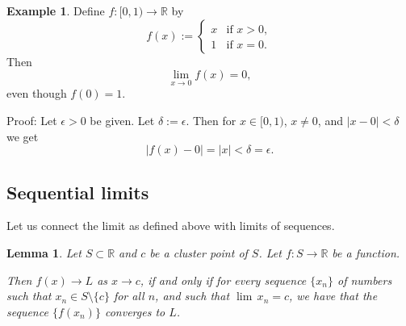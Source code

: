 \documentclass[12pt]{book}
\newcommand{\abs}[1]{\left\lvert {#1} \right\rvert}
\newcommand{\R}{{\mathbb{R}}}
\theoremstyle{plain}
\newtheorem{lemma}[thm]{Lemma}
\theoremstyle{remark}
\theoremstyle{definition}
\theoremstyle{exercise}
\theoremstyle{example}
\newtheorem{example}[thm]{Example}
\begin{document}
\begin{example}
Define $f \colon [0,1) \to \R$ by
\begin{equation*}
f(x) := 
\begin{cases}
x & \text{if $x > 0$} , \\
1 & \text{if $x = 0$} .
\end{cases}
\end{equation*}
Then
\begin{equation*}
\lim_{x\to 0} f(x) = 0 ,
\end{equation*}
even though $f(0) = 1$.

Proof:  Let $\epsilon > 0$ be given.  Let $\delta := \epsilon$.
Then for $x \in [0,1)$, $x \not= 0$, and $\abs{x-0} < \delta$ we get
\begin{equation*}
\abs{f(x) - 0} = \abs{x} < \delta = \epsilon .
\end{equation*}
\end{example}

\subsection{Sequential limits} \label{subseq:sequentiallimits}

Let us connect the limit as defined above with limits of sequences.

\begin{lemma}\label{seqflimit:lemma}
Let $S \subset \R$ and $c$ be a cluster point of $S$.  Let $f \colon S \to
\R$ be a function.

Then
$f(x) \to L$ as $x \to c$, if and only if for every sequence $\{ x_n \}$
of numbers such that $x_n \in S \setminus \{c\}$ for all $n$,
and such that $\lim\, x_n = c$,
we have that the sequence $\{ f(x_n) \}$ converges to $L$.
\end{lemma}
\end{document}

